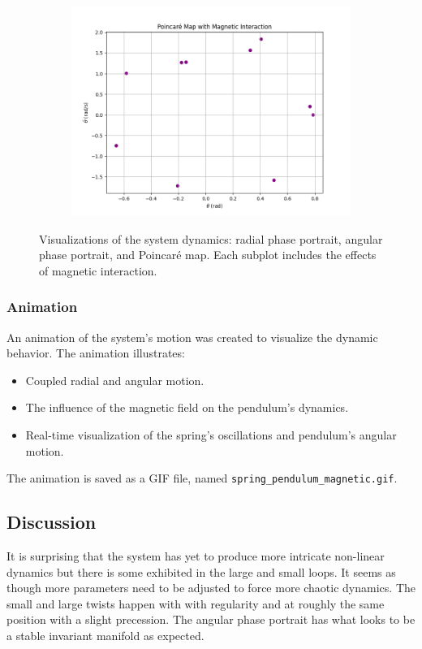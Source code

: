 \documentclass[12pt]{article}
\begin{document}
\begin{figure}[h!]
\begin{subfigure}{0.28\textwidth}
        \includegraphics[width=\textwidth]{poincare_map_magnetic.png}
        \label{fig:poincare_map}
    \end{subfigure}
    \caption{Visualizations of the system dynamics: radial phase portrait, angular phase portrait, and Poincaré map. Each subplot includes the effects of magnetic interaction.}
    \label{fig:system_dynamics_visualizations}
\end{figure}

\subsubsection{Animation}
An animation of the system's motion was created to visualize the dynamic behavior. The animation illustrates:
\begin{itemize}
    \item Coupled radial and angular motion.
    \item The influence of the magnetic field on the pendulum's dynamics.
    \item Real-time visualization of the spring's oscillations and pendulum's angular motion.
\end{itemize}
The animation is saved as a GIF file, named \texttt{spring\_pendulum\_magnetic.gif}.

\subsection{Discussion}
It is surprising that the system has yet to produce more intricate non-linear dynamics but there is some exhibited in the large and small loops. It seems as though more parameters need to be adjusted to force more chaotic dynamics. The small and large twists happen with with regularity and at roughly the same position with a slight precession. The angular phase portrait has what looks to be a stable invariant manifold as expected.   
\end{document}
